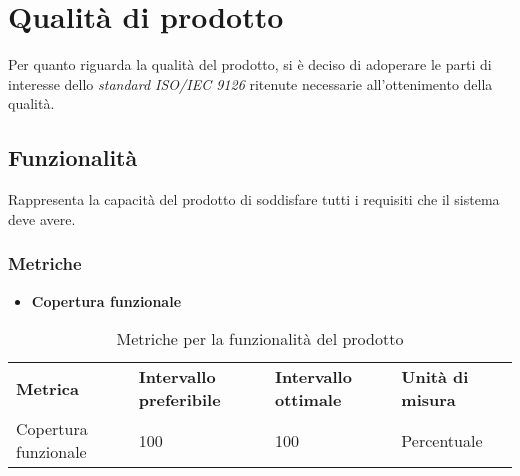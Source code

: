 \section{Qualità di prodotto}
Per quanto riguarda la qualità del prodotto, si è deciso di adoperare le parti di interesse dello \textit{standard ISO/IEC 9126\glos} ritenute necessarie all'ottenimento della qualità.
\subsection{Funzionalità}
Rappresenta la capacità del prodotto di soddisfare tutti i requisiti che il sistema deve avere.
\subsubsection{Metriche}
\begin{itemize}
	\item \textbf{Copertura funzionale}
\end{itemize}

\renewcommand{\arraystretch}{2.2}
\begin{longtable}{|C{4.5cm}|C{2.25cm}|C{2.25cm}|C{3cm}|}

	\caption{Metriche per la funzionalità del prodotto}\\
	\hline

	\textbf{Metrica} & \textbf{Intervallo preferibile}  & \textbf{Intervallo ottimale} & \textbf{Unità di misura}
	\tabularnewline
	\endfirsthead

	Copertura funzionale &  100 & 100 & Percentuale \\

\end{longtable}

